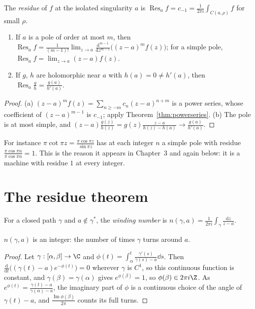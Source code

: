 \begin{definition}
The \emph{residue} of $f$ at the isolated singularity $a$ is $\operatorname{Res}_af=c_{-1}=\frac1{2\pi i}\int_{C(a,\rho)}f$ for small $\rho$.
\end{definition}

\begin{proposition}\label{prop:rescalc}
\begin{enumerate}[label=(\alph*)]
\item If $a$ is a pole of order at most $m$, then $\operatorname{Res}_af=\frac1{(m-1)!}\lim_{z\to a}\frac{\mathrm d^{m-1}}{\mathrm dz^{m-1}}\bigl((z-a)^mf(z)\bigr)$; for a simple pole,
$\operatorname{Res}_af=\lim_{z\to a}(z-a)f(z)$.
\item If $g$, $h$ are holomorphic near $a$ with $h(a)=0\ne h'(a)$, then $\operatorname{Res}_a\frac gh=\frac{g(a)}{h'(a)}$.
\end{enumerate}
\end{proposition}
\begin{proof}
(a) $(z-a)^mf(z)=\sum_{n\ge-m}c_n(z-a)^{n+m}$ is a power series, whose coefficient of $(z-a)^{m-1}$ is $c_{-1}$; apply Theorem~\ref{thm:powerseries}. (b) The pole is
at most simple, and $(z-a)\frac{g(z)}{h(z)}=g(z)\frac{z-a}{h(z)-h(a)}\to\frac{g(a)}{h'(a)}$.
\end{proof}

For instance $\pi\cot\pi z=\frac{\pi\cos\pi z}{\sin\pi z}$ has at each integer $n$ a simple pole with residue $\frac{\pi\cos\pi n}{\pi\cos\pi n}=1$. This is the reason it
appears in Chapter~3 and again below: it is a machine with residue $1$ at every integer.

\section{The residue theorem}

For a closed path $\gamma$ and $a\notin\gamma^*$, the \emph{winding number} is $n(\gamma,a)=\frac1{2\pi i}\int_\gamma\frac{\mathrm dz}{z-a}$.

\begin{proposition}\label{prop:winding}
$n(\gamma,a)$ is an integer: the number of times $\gamma$ turns around $a$.
\end{proposition}
\begin{proof}
Let $\gamma:[\alpha,\beta]\to\C$ and $\phi(t)=\int_\alpha^t\frac{\gamma'(s)}{\gamma(s)-a}\dd s$. Then $\frac{\mathrm d}{\mathrm dt}\bigl((\gamma(t)-a)e^{-\phi(t)}\bigr)=0$ wherever $\gamma$ is $C^1$, so this
continuous function is constant, and $\gamma(\beta)=\gamma(\alpha)$ gives $e^{\phi(\beta)}=1$, so $\phi(\beta)\in2\pi i\Z$. As $e^{\phi(t)}=\frac{\gamma(t)-a}{\gamma(\alpha)-a}$, the imaginary part
of $\phi$ is a continuous choice of the angle of $\gamma(t)-a$, and $\frac{\operatorname{Im}\phi(\beta)}{2\pi}$ counts its full turns.
\end{proof}

